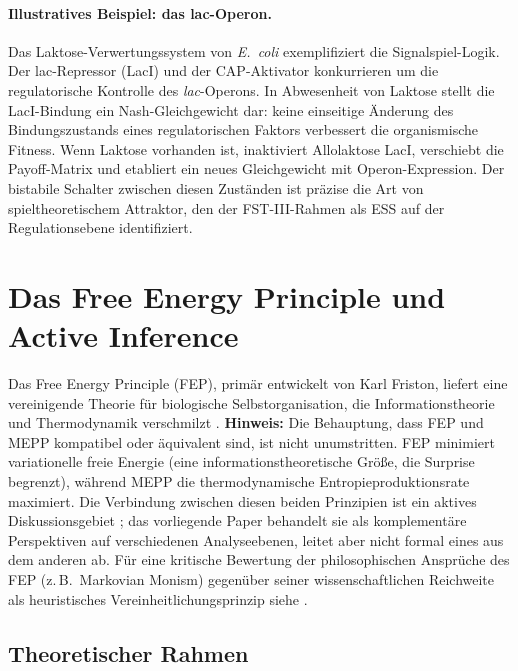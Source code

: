 \documentclass[12pt,a4paper]{article}
\theoremstyle{remark}
\begin{document}
\paragraph{Illustratives Beispiel: das lac-Operon.}
Das Laktose-Verwertungssystem von \textit{E.\ coli} exemplifiziert die Signalspiel-Logik. Der lac-Repressor (LacI) und der CAP-Aktivator konkurrieren um die regulatorische Kontrolle des \textit{lac}-Operons. In Abwesenheit von Laktose stellt die LacI-Bindung ein Nash-Gleichgewicht dar: keine einseitige \"Anderung des Bindungszustands eines regulatorischen Faktors verbessert die organismische Fitness. Wenn Laktose vorhanden ist, inaktiviert Allolaktose LacI, verschiebt die Payoff-Matrix und etabliert ein neues Gleichgewicht mit Operon-Expression. Der bistabile Schalter zwischen diesen Zust\"anden ist pr\"azise die Art von spieltheoretischem Attraktor, den der FST-III-Rahmen als ESS auf der Regulationsebene identifiziert.

\section{Das Free Energy Principle und Active Inference}
\label{sec:fep}

Das Free Energy Principle (FEP), prim\"ar entwickelt von Karl Friston, liefert eine vereinigende Theorie f\"ur biologische Selbstorganisation, die Informationstheorie und Thermodynamik verschmilzt \citep{FristonFreeEnergy,FristonPDF}. \textbf{Hinweis:} Die Behauptung, dass FEP und MEPP kompatibel oder \"aquivalent sind, ist nicht unumstritten. FEP minimiert variationelle freie Energie (eine informationstheoretische Gr\"o\ss{}e, die Surprise begrenzt), w\"ahrend MEPP die thermodynamische Entropieproduktionsrate maximiert. Die Verbindung zwischen diesen beiden Prinzipien ist ein aktives Diskussionsgebiet \citep{FristonFreeEnergy}; das vorliegende Paper behandelt sie als komplement\"are Perspektiven auf verschiedenen Analyseebenen, leitet aber nicht formal eines aus dem anderen ab. F\"ur eine kritische Bewertung der philosophischen Anspr\"uche des FEP (z.\,B.\ Markovian Monism) gegen\"uber seiner wissenschaftlichen Reichweite als heuristisches Vereinheitlichungsprinzip siehe \cite{SanchezCanizares2021}.

\subsection{Theoretischer Rahmen}
\end{document}
